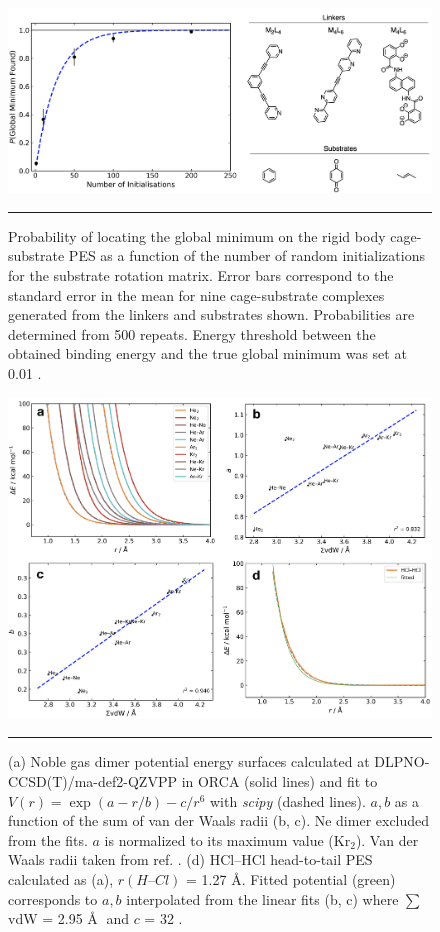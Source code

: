 \documentclass[../../main.tex]{subfiles}
\begin{document}
\begin{figure}[h!]
	\vspace{0.4cm}
	\centering
	\includegraphics[width=\textwidth]{3/cgbind/figs/figS2}
	\vspace{0.2cm}
	\hrule
	\caption{Probability of locating the global minimum on the rigid body cage-substrate PES as a function of the number of random initializations for the substrate rotation matrix. Error bars correspond to the standard error in the mean for nine cage-substrate complexes generated from the linkers and substrates shown. Probabilities are determined from 500 repeats. Energy threshold between the obtained binding energy and the true global minimum was set at 0.01 \kcal.}
	\label{fig::si_cg_2}
\end{figure}



\begin{figure}[h!]
	\vspace{0.4cm}
	\centering
	 \includegraphics[width=\textwidth]{3/cgbind/figs/figS3}
	\vspace{0.2cm}
	\hrule
	\caption{(a) Noble gas dimer potential energy surfaces calculated at DLPNO-CCSD(T)/ma-def2-QZVPP in ORCA (solid lines) and fit to $V(r) = \exp(a-r/b) - c/r^6$ with \emph{scipy} (dashed lines). $a, b$ as a function of the sum of van der Waals radii (b, c). Ne dimer excluded from the fits. $a$ is normalized to its maximum value (Kr${}_2$). Van der Waals radii taken from ref. \cite{Mantina2009}. (d) HCl–HCl head-to-tail PES calculated as (a), $r(H–Cl)$ = 1.27 \AA. Fitted potential (green) corresponds to $a, b$ interpolated from the linear fits (b, c) where $\sum$vdW = 2.95 \AA$\;$ and $c$ = 32 \kcal.}
	\label{fig::si_cg_3}
\end{figure}
\end{document}
